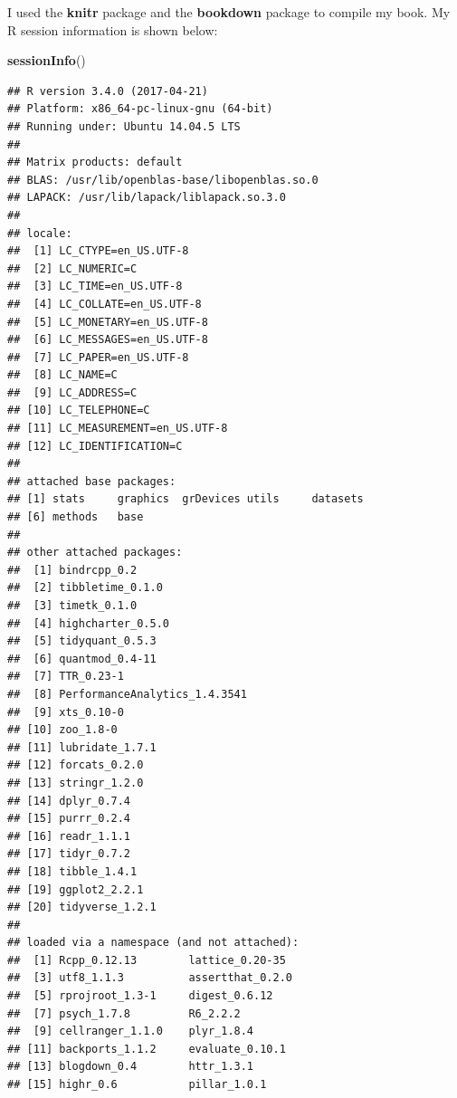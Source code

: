 \documentclass[]{krantz}
\makeatletter
\newenvironment{Shaded}{\begin{snugshade}}{\end{snugshade}}
\newcommand{\KeywordTok}[1]{\textcolor[rgb]{0.13,0.29,0.53}{\textbf{#1}}}
\newcommand{\NormalTok}[1]{#1}
\newenvironment{kframe}{%
\medskip{}
\setlength{\fboxsep}{.8em}
 \def\at@end@of@kframe{}%
 \ifinner\ifhmode%
  \def\at@end@of@kframe{\end{minipage}}%
  \begin{minipage}{\columnwidth}%
 \fi\fi%
 \def\FrameCommand##1{\hskip\@totalleftmargin \hskip-\fboxsep
 \colorbox{shadecolor}{##1}\hskip-\fboxsep
     \hskip-\linewidth \hskip-\@totalleftmargin \hskip\columnwidth}%
 \MakeFramed {\advance\hsize-\width
   \@totalleftmargin\z@ \linewidth\hsize
   \@setminipage}}%
 {\par\unskip\endMakeFramed%
 \at@end@of@kframe}
\renewenvironment{Shaded}{\begin{kframe}}{\end{kframe}}
\makeatother
\begin{document}
I used the \textbf{knitr} package \citep{xie2015} and the
\textbf{bookdown} package \citep{R-bookdown} to compile
my book. My R session information is shown below:

\begin{Shaded}
\begin{Highlighting}[]
\KeywordTok{sessionInfo}\NormalTok{()}
\end{Highlighting}
\end{Shaded}

\begin{verbatim}
## R version 3.4.0 (2017-04-21)
## Platform: x86_64-pc-linux-gnu (64-bit)
## Running under: Ubuntu 14.04.5 LTS
## 
## Matrix products: default
## BLAS: /usr/lib/openblas-base/libopenblas.so.0
## LAPACK: /usr/lib/lapack/liblapack.so.3.0
## 
## locale:
##  [1] LC_CTYPE=en_US.UTF-8      
##  [2] LC_NUMERIC=C              
##  [3] LC_TIME=en_US.UTF-8       
##  [4] LC_COLLATE=en_US.UTF-8    
##  [5] LC_MONETARY=en_US.UTF-8   
##  [6] LC_MESSAGES=en_US.UTF-8   
##  [7] LC_PAPER=en_US.UTF-8      
##  [8] LC_NAME=C                 
##  [9] LC_ADDRESS=C              
## [10] LC_TELEPHONE=C            
## [11] LC_MEASUREMENT=en_US.UTF-8
## [12] LC_IDENTIFICATION=C       
## 
## attached base packages:
## [1] stats     graphics  grDevices utils     datasets 
## [6] methods   base     
## 
## other attached packages:
##  [1] bindrcpp_0.2                 
##  [2] tibbletime_0.1.0             
##  [3] timetk_0.1.0                 
##  [4] highcharter_0.5.0            
##  [5] tidyquant_0.5.3              
##  [6] quantmod_0.4-11              
##  [7] TTR_0.23-1                   
##  [8] PerformanceAnalytics_1.4.3541
##  [9] xts_0.10-0                   
## [10] zoo_1.8-0                    
## [11] lubridate_1.7.1              
## [12] forcats_0.2.0                
## [13] stringr_1.2.0                
## [14] dplyr_0.7.4                  
## [15] purrr_0.2.4                  
## [16] readr_1.1.1                  
## [17] tidyr_0.7.2                  
## [18] tibble_1.4.1                 
## [19] ggplot2_2.2.1                
## [20] tidyverse_1.2.1              
## 
## loaded via a namespace (and not attached):
##  [1] Rcpp_0.12.13        lattice_0.20-35    
##  [3] utf8_1.1.3          assertthat_0.2.0   
##  [5] rprojroot_1.3-1     digest_0.6.12      
##  [7] psych_1.7.8         R6_2.2.2           
##  [9] cellranger_1.1.0    plyr_1.8.4         
## [11] backports_1.1.2     evaluate_0.10.1    
## [13] blogdown_0.4        httr_1.3.1         
## [15] highr_0.6           pillar_1.0.1       

\end{verbatim}
\end{document}
